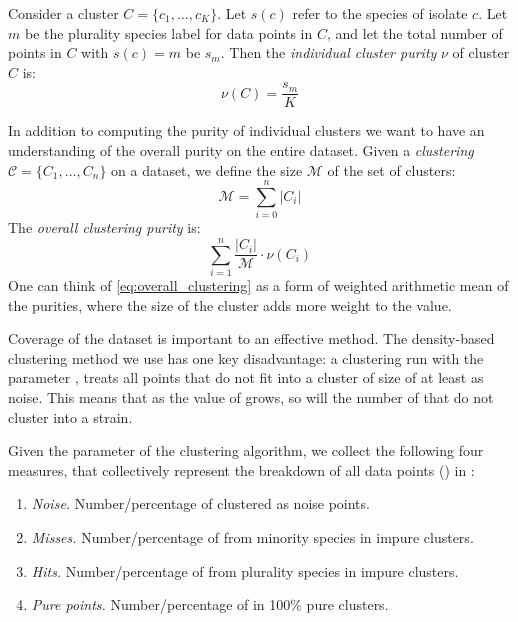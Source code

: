 Consider a cluster $C=\{c_1,\ldots, c_K\}$. Let $s(c)$ refer to the species of isolate $c$.
Let $m$ be the plurality species label for data points in $C$, and let the total number of points in
$C$ with $s(c) = m$ be $s_m$. Then the \textit{individual cluster purity} $\nu$ of cluster $C$ is:
\[
    \nu(C) = \frac{s_m}{K}
\]

In addition to computing the purity of individual clusters we want to have an understanding of the overall purity on the entire dataset.
Given a \textit{clustering} $\mathcal{C} = \{C_1,\dots,C_n\}$ on a dataset, we define the size $\mathcal{M}$ of the set of clusters: 
\begin{equation}\label{eq:num_isols}
\mathcal{M} = \sum_{i = 0}^{n} |C_i|
\end{equation}
The \textit{overall clustering purity} is:
\begin{equation}\label{eq:overall_clustering}
\sum_{i=1}^{n} \frac{|C_i|}{\mathcal{M}}\cdot\nu(C_i)
\end{equation}
One can think of \eqref{eq:overall_clustering} as a form of weighted arithmetic mean of the purities, where the size of the cluster adds more weight to the value.

\label{sec:validation:coverage}
Coverage of the dataset is important to an effective \mst{} method.
The density-based clustering method we use has one key disadvantage: a clustering run  with the parameter \minneigh{}, treats all points that do not fit into a cluster of size  of at least \minneigh{} as noise.
This means that as the value of \minneigh{} grows, so will the number of \isols{} that do not cluster into a strain.

Given the parameter \minneigh{} of the clustering algorithm, we collect the following four measures, that collectively represent the breakdown of all data points (\isols{}) in \cplop{}:
\begin{enumerate}
    \item \textit{Noise.} Number/percentage of \isols{} clustered as noise points.
    \item \textit{Misses.} Number/percentage of \isols{} from  minority species
    in impure clusters.
     \item \textit{Hits.} Number/percentage of \isols{} from plurality species in
     impure clusters.
     \item \textit{Pure points.} Number/percentage of \isols{} in 100\% pure clusters.
\end{enumerate}
